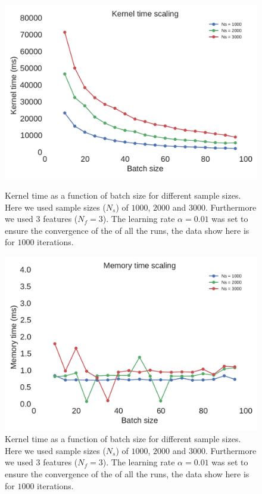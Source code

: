 \documentclass[11pt,a4paper]{article}
\begin{document}
\begin{figure}[H]
	\centering
  \includegraphics[width=\linewidth]{batch_size_scaling_kernel.pdf}
  \caption{Kernel time as a function of batch size for different sample sizes. Here we used sample sizes ($N_s$) of $1000$, $2000$ and $3000$. Furthermore we used $3$ features ($N_f=3$). The learning rate $\alpha=0.01$ was set to ensure the convergence of the of all the runs, the data show here is for $1000$ iterations.}
  \label{fig:batch_size_scaling_kernel}
\endminipage
\hfill
{}
  \includegraphics[width=\linewidth]{batch_size_scaling_memory.pdf}
  \caption{Kernel time as a function of batch size for different sample sizes. Here we used sample sizes ($N_s$) of $1000$, $2000$ and $3000$. Furthermore we used $3$ features ($N_f=3$). The learning rate $\alpha=0.01$ was set to ensure the convergence of the of all the runs, the data show here is for $1000$ iterations.}
  \label{fig:batch_size_scaling_memory}
\endminipage
\end{figure}
\end{document}
